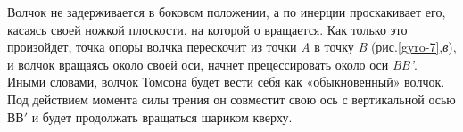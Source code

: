\documentclass[14pt,a4paper,oneside]{extarticle}	%
\begin{document}
			Волчок не задерживается в боковом положении, а по инерции проскакивает его, касаясь своей ножкой плоскости, на которой о вращается.
			Как только это произойдет, точка опоры волчка перескочит из точки  \textit{A} в точку  \textit{B} (рис.\ref{gyro-7},\textit{в}), и волчок вращаясь около своей оси, начнет прецессировать около оси \textit{BB'}. 
			Иными словами, волчок Томсона будет вести себя как «обыкновенный» волчок. 
			Под действием момента силы трения он совместит свою ось с вертикальной осью $ \text{ВВ}' $ и будет продолжать вращаться шариком кверху. 
			
			
%			
%			
%			
	
\end{document}
